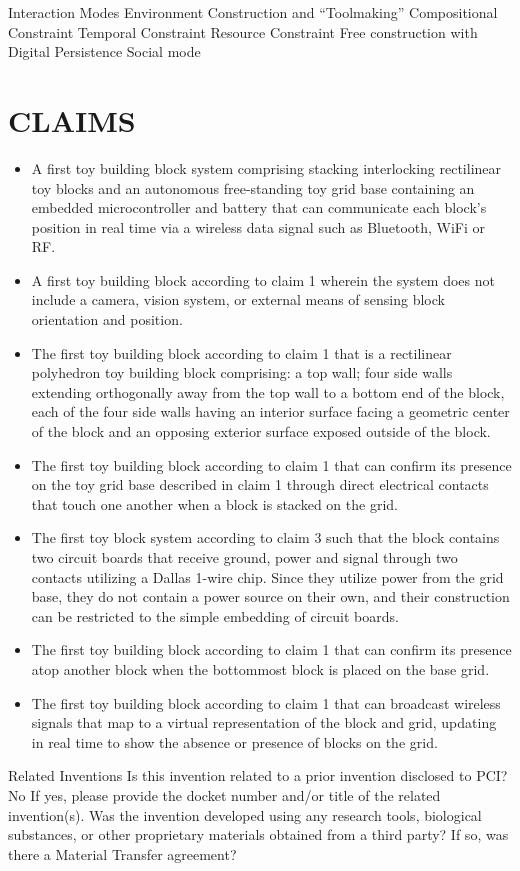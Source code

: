 \documentclass[]{article}
\begin{document}
Interaction Modes
Environment Construction and “Toolmaking”
Compositional Constraint
Temporal Constraint
Resource Constraint
Free construction with Digital Persistence
Social mode




\section{CLAIMS}
\begin{itemize}
\item A first toy building block system comprising stacking interlocking rectilinear toy blocks and an autonomous free-standing toy grid base containing an embedded microcontroller and battery that can communicate each block’s position in real time via a wireless data signal such as Bluetooth, WiFi or RF.

\item A first toy building block according to claim 1 wherein the system does not include a camera, vision system, or external means of sensing block orientation and position. 

\item The first toy building block according to claim 1 that is a rectilinear polyhedron toy building block comprising: a top wall; four side walls extending orthogonally away from the top wall to a bottom end of the block, each of the four side walls having an interior surface facing a geometric center of the block and an opposing exterior surface exposed outside of the block.

\item The first toy building block according to claim 1 that can confirm its presence on the toy grid base described in claim 1 through direct electrical contacts that touch one another when a block is stacked on the grid. 

\item The first toy block system according to claim 3 such that the block contains two circuit boards that receive ground, power and signal through two contacts utilizing a Dallas 1-wire chip. Since they utilize power from the grid base, they do not contain a power source on their own, and their construction can be restricted to the simple embedding of circuit boards.

\item The first toy building block according to claim 1 that can confirm its presence atop another block when the bottommost block is placed on the base grid.

\item The first toy building block according to claim 1 that can broadcast wireless signals that map to a virtual representation of the block and grid, updating in real time to show the absence or presence of blocks on the grid.
\end{itemize}

Related Inventions
Is this invention related to a prior invention disclosed to PCI? No
If yes, please provide the docket number and/or title of the related invention(s).
Was the invention developed using any research tools, biological substances, or other proprietary materials obtained from a third party? If so, was there a Material Transfer agreement?
\end{document}
